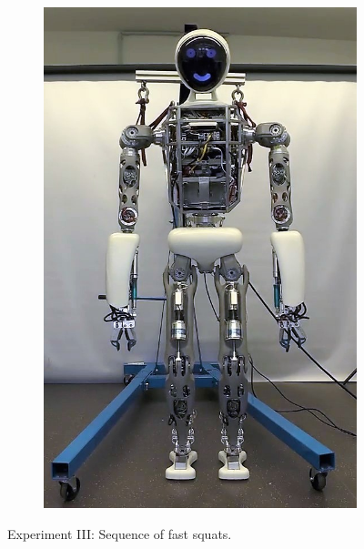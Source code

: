 \begin{figure}[h!]
\begin{subfigure}{.14\textwidth}
	\includegraphics[width=.95\linewidth]{experiments/squats/snaps/7}
	\end{subfigure}%
\caption[Experiment III: Sequence of fast squats]{Experiment III: Sequence of fast squats.}
\label{exp:squatSnaps}
\end{figure} 

